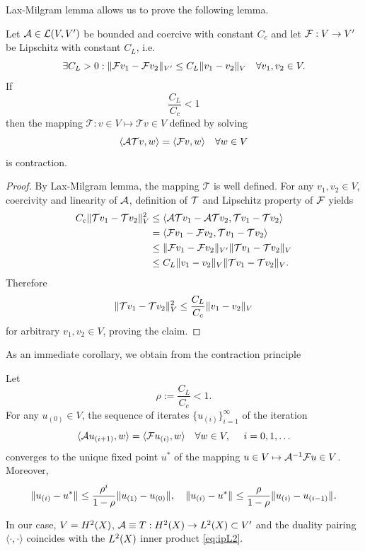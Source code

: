 {Lax-Milgram lemma allows us to prove the following lemma.
\begin{lemma}
	Let $\genop{A}\in\mathcal{L}(V,V')$ be bounded and coercive with constant $C_c$
	and let $\genop{F}:V\to V'$ be Lipschitz with constant $C_L$, i.e. 
	$$
		\exists C_L > 0: \norm[V']{\mathcal{F}v_1 - \mathcal{F}v_2} \leq C_L \norm[V]{v_1 - v_2}\quad \forall v_1,v_2 \in V. 
	$$
	If
	$$
		\frac{C_L}{C_c} < 1
	$$
	then the mapping $\mathcal{T} : v\in V \mapsto \mathcal{T}v\in V$ defined by solving
	$$
		\langle\genop{A}\mathcal{T}v, w\rangle = \langle \genop{F}v, w \rangle\quad \forall w \in V 
	$$
	is contraction.
\end{lemma}
\begin{proof}
	By Lax-Milgram lemma, the mapping $\mathcal{T}$ is well defined. For any $v_1,v_2\in V$, coercivity and
	linearity of $\genop{A}$, definition of $\genop{T}$ and Lipschitz property of $\genop{F}$ yields 
	$$
	\begin{aligned}
		C_c \norm[V]{\mathcal{T}v_1 - \mathcal{T}v_2}^2 &\leq 
		\langle \genop{A}\mathcal{T}v_1 - \genop{A}\mathcal{T}v_2, \mathcal{T}v_1 - \mathcal{T}v_2 \rangle \\
		& = \langle \genop{F}v_1 - \genop{F}v_2,  \mathcal{T}v_1 - \mathcal{T}v_2 \rangle \\
		& \leq \norm[V']{\mathcal{F}v_1 - \mathcal{F}v_2} \norm[V]{\mathcal{T}v_1 - \mathcal{T}v_2}\\
		& \leq C_L \norm[V]{v_1 - v_2} \norm[V]{\mathcal{T}v_1 - \mathcal{T}v_2}.
	\end{aligned}
	$$
	Therefore
	$$
		\norm[V]{\mathcal{T}v_1 - \mathcal{T}v_2}^2 \leq \frac{C_L}{C_c}\norm[V]{v_1 - v_2} 
	$$ 
	for arbitrary $v_1, v_2\in V$, proving the claim.
\end{proof}
As an immediate corollary, we obtain from the contraction principle
\begin{corollary}
	Let 
	$$
		\rho := \frac{C_L}{C_c} < 1.
	$$
	For any $u_{(0)} \in V$, the sequence of iterates $\{u_{(i)}\}_{i=1}^{\infty}$ of the iteration
	$$
		\langle\genop{A}u_{(i+1)},w\rangle = \langle \genop{F}u_{(i)}, w\rangle\quad \forall w \in V,\ \quad i = 0,1,\ldots
	$$
	converges to the unique fixed point $u^*$ of the mapping $u\in V \mapsto \genop{A}^{-1}\genop{F}u \in V$. Moreover, 
	$$
		\norm{u_{(i)} - u^*} \leq \frac{\rho^{i}}{1-\rho} \norm{u_{(1)} - u_{(0)}},\quad
		\norm{u_{(i)} - u^*} \leq \frac{\rho}{1-\rho} \norm{u_{(i)} - u_{(i-1)}}.
	$$   
\end{corollary}

In our case, $V = \Hp[2](X)$, $\genop{A} \equiv T : \Hp[2](X) \to \Lp[2](X) \subset V'$ and the duality pairing
$\langle \cdot,\cdot\rangle$ coincides with the $\Lp[2](X)$ inner product \eqref{eq:ipL2}.


}
